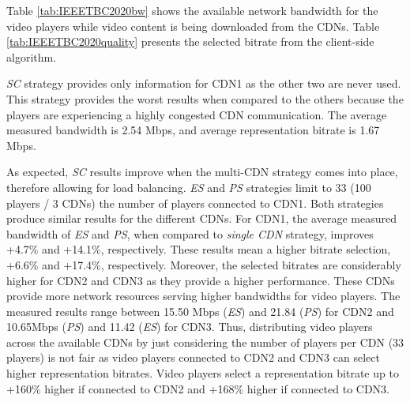 Table \ref{tab:IEEETBC2020bw} shows the available network bandwidth for the video players while video content is being downloaded from the CDNs. Table \ref{tab:IEEETBC2020quality} presents the selected bitrate from the client-side algorithm.

\textit{SC} strategy provides only information for CDN1 as the other two are never used. This strategy provides the worst results when compared to the others because the players are experiencing a highly congested CDN communication. The average measured bandwidth is 2.54 Mbps, and average representation bitrate is 1.67 Mbps.

As expected, \textit{SC} results improve when the multi-CDN strategy comes into place, therefore allowing for load balancing. \textit{ES} and \textit{PS} strategies limit to 33 (100 players / 3 CDNs) the number of players connected to CDN1. Both strategies produce similar results for the different CDNs. For CDN1, the average measured bandwidth of \textit{ES} and \textit{PS}, when compared to \textit{single CDN} strategy, improves +4.7\% and +14.1\%, respectively. These results mean a higher bitrate selection, +6.6\% and +17.4\%, respectively. Moreover, the selected bitrates are considerably higher for CDN2 and CDN3 as they provide a higher performance. These CDNs provide more network resources serving higher bandwidths for video players. The measured results range between 15.50 Mbps (\textit{ES}) and 21.84 (\textit{PS}) for CDN2 and 10.65Mbps (\textit{PS}) and 11.42 (\textit{ES}) for CDN3. Thus, distributing video players across the available CDNs by just considering the number of players per CDN (33 players) is not fair as video players connected to CDN2 and CDN3 can select higher representation bitrates. Video players select a representation bitrate up to +160\% higher if connected to CDN2 and +168\% higher if connected to CDN3.

